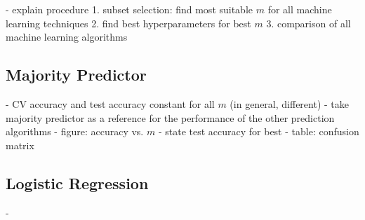 - explain procedure
1. subset selection: find most suitable $m$ for all machine learning techniques
2. find best hyperparameters for best $m$
3. comparison of all machine learning algorithms

\subsection{Majority Predictor}
- CV accuracy and test accuracy constant for all $m$ (in general, different)
- take majority predictor as a reference for the performance of the other prediction algorithms
- figure: accuracy vs. $m$
- state test accuracy for best 
- table: confusion matrix

\subsection{Logistic Regression}
- 